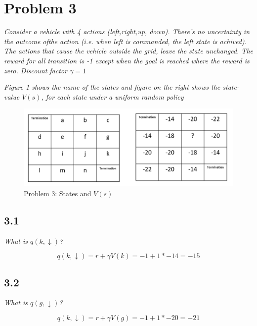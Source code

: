 \documentclass{article}
\begin{document}
\section*{Problem 3}

\textit{Consider a vehicle with 4 actions (left,right,up, down). There’s no uncertainty in the outcome ofthe action (i.e. when left is commanded, the left state is achived). The actions that cause the vehicle outside the grid, leave the state unchanged. The reward for all transition is -1 except when the goal is reached where the reward is zero. Discount factor $\gamma = 1$}

\textit{Figure 1 shows the name of the states and figure on the right shows the state-value $V(s)$, for each state under a uniform random policy}

\begin{figure}
    \centering
    \includegraphics[width=.8\linewidth]{imgs/midterm.3.png}
    \caption{Problem 3: States and $V(s)$}
\end{figure}

\subsection*{3.1}

\textit{What is $q(k, \downarrow)$?}

\begin{equation}
    q(k, \downarrow) = r + \gamma V(k) = -1 + 1 * -14 = -15
\end{equation}



\subsection*{3.2}

\textit{What is $q(g, \downarrow)$?}

\begin{equation}
    q(k, \downarrow) = r + \gamma V(g) = -1 + 1 * -20 = -21
\end{equation}
\end{document}
